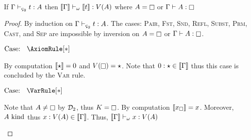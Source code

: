 \begin{theorem}
    \label{lem:3:soundness_of_sema}
    If $\Gamma \vdash_{\ced} t : A$ then $\llbracket \Gamma \rrbracket \vdash_\omega \llbracket t \rrbracket : V(A)$
    where $A = \kind$ or $\Gamma \vdash A : \kind$
\end{theorem}
\begin{proof}
    By induction on $\Gamma \vdash_{\ced} t : A$.
    The cases: \textsc{Pair}, \textsc{Fst}, \textsc{Snd}, \textsc{Refl}, \textsc{Subst}, \textsc{Prm}, \textsc{Cast}, and \textsc{Sep} are impossible by inversion on $A = \kind$ or $\Gamma \vdash A : \kind$.

    $\text{Case: }\begin{array}{c} \AxiomRule[*] \end{array}$
    \begin{proofcase}
        By computation $\llbracket \star \rrbracket = 0$ and $V(\kind) = \star$.
        Note that $0 : \star \in \llbracket \Gamma \rrbracket$ thus this case is concluded by the \textsc{Var} rule.
    \end{proofcase}

    $\text{Case: }\begin{array}{c} \VarRule[*] \end{array}$
    \begin{proofcase}
        Note that $A \neq \kind$ by $\mathcal{D}_{2}$, thus $K = \kind$.
        By computation $\llbracket x_\square \rrbracket = x$.
        Moreover, $A~\textnormal{kind}$ thus $x : V(A) \in \llbracket \Gamma \rrbracket$.
        Thus, $\llbracket \Gamma \rrbracket \vdash_\omega x : V(A)$
    \end{proofcase}


\end{proof}
